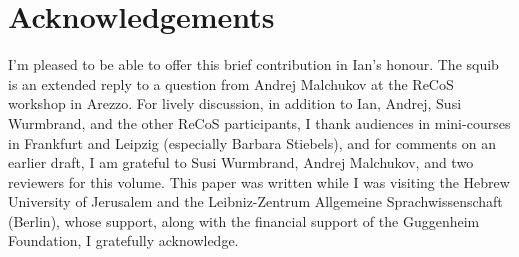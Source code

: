 \documentclass[output=paper]{langsci/langscibook}
\begin{document}
\printchapterglossary{}

\section*{Acknowledgements}

I'm pleased to be able to offer this brief contribution in Ian's honour. The
squib is an extended reply to a question from Andrej Malchukov at the ReCoS
workshop in Arezzo. For lively discussion, in addition to Ian, Andrej, Susi
Wurmbrand, and the other ReCoS participants, I thank audiences in mini-courses
in Frankfurt and Leipzig (especially Barbara Stiebels), and for comments on an
earlier draft, I am grateful to Susi Wurmbrand, Andrej Malchukov, and two
reviewers for this volume. This paper was written while I was visiting the
Hebrew University of Jerusalem and the Leibniz-Zentrum Allgemeine
Sprachwissenschaft (Berlin), whose support, along with the financial support of
the Guggenheim Foundation, I gratefully acknowledge.

{\sloppy
\printbibliography[heading=subbibliography,notkeyword=this]
}
\end{document}
